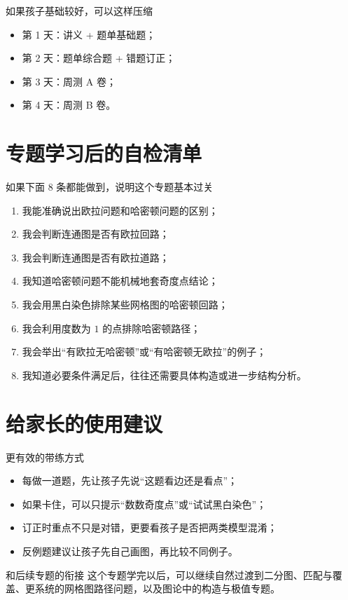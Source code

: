 \documentclass[11pt,a4paper,fontset=fandol]{ctexart}
\begin{document}
\begin{infobox}{如果孩子基础较好，可以这样压缩}
\begin{itemize}
  \item 第 1 天：讲义 + 题单基础题；
  \item 第 2 天：题单综合题 + 错题订正；
  \item 第 3 天：周测 A 卷；
  \item 第 4 天：周测 B 卷。
\end{itemize}
\end{infobox}

\section{专题学习后的自检清单}

\begin{goalbox}{如果下面 8 条都能做到，说明这个专题基本过关}
\begin{enumerate}
  \item 我能准确说出欧拉问题和哈密顿问题的区别；
  \item 我会判断连通图是否有欧拉回路；
  \item 我会判断连通图是否有欧拉道路；
  \item 我知道哈密顿问题不能机械地套奇度点结论；
  \item 我会用黑白染色排除某些网格图的哈密顿回路；
  \item 我会利用度数为 $1$ 的点排除哈密顿路径；
  \item 我会举出“有欧拉无哈密顿”或“有哈密顿无欧拉”的例子；
  \item 我知道必要条件满足后，往往还需要具体构造或进一步结构分析。
\end{enumerate}
\end{goalbox}

\section{给家长的使用建议}

\begin{warnbox}{更有效的带练方式}
\begin{itemize}
  \item 每做一道题，先让孩子先说“这题看边还是看点”；
  \item 如果卡住，可以只提示“数数奇度点”或“试试黑白染色”；
  \item 订正时重点不只是对错，更要看孩子是否把两类模型混淆；
  \item 反例题建议让孩子先自己画图，再比较不同例子。
\end{itemize}
\end{warnbox}

\begin{infobox}{和后续专题的衔接}
这个专题学完以后，可以继续自然过渡到二分图、匹配与覆盖、更系统的网格图路径问题，以及图论中的构造与极值专题。
\end{infobox}
\end{document}
